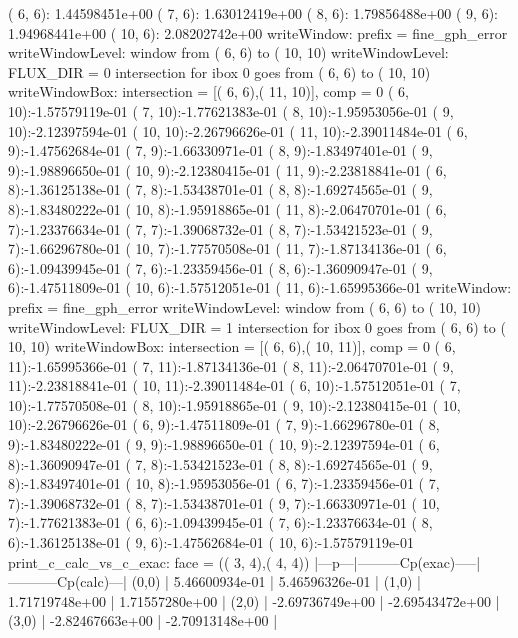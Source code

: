 \begin{itemize}
(  6,  6): 1.44598451e+00  (  7,  6): 1.63012419e+00  (  8,  6): 1.79856488e+00  (  9,  6): 1.94968441e+00  ( 10,  6): 2.08202742e+00  
writeWindow: prefix = fine_gph_error     
writeWindowLevel:  window from (  6,  6) to ( 10, 10)
writeWindowLevel: FLUX_DIR = 0
 intersection for ibox  0 goes from (  6,  6) to ( 10, 10)
writeWindowBox: intersection = [(  6,  6),( 11, 10)], comp = 0
(  6, 10):-1.57579119e-01  (  7, 10):-1.77621383e-01  (  8, 10):-1.95953056e-01  (  9, 10):-2.12397594e-01  ( 10, 10):-2.26796626e-01  ( 11, 10):-2.39011484e-01  
(  6,  9):-1.47562684e-01  (  7,  9):-1.66330971e-01  (  8,  9):-1.83497401e-01  (  9,  9):-1.98896650e-01  ( 10,  9):-2.12380415e-01  ( 11,  9):-2.23818841e-01  
(  6,  8):-1.36125138e-01  (  7,  8):-1.53438701e-01  (  8,  8):-1.69274565e-01  (  9,  8):-1.83480222e-01  ( 10,  8):-1.95918865e-01  ( 11,  8):-2.06470701e-01  
(  6,  7):-1.23376634e-01  (  7,  7):-1.39068732e-01  (  8,  7):-1.53421523e-01  (  9,  7):-1.66296780e-01  ( 10,  7):-1.77570508e-01  ( 11,  7):-1.87134136e-01  
(  6,  6):-1.09439945e-01  (  7,  6):-1.23359456e-01  (  8,  6):-1.36090947e-01  (  9,  6):-1.47511809e-01  ( 10,  6):-1.57512051e-01  ( 11,  6):-1.65995366e-01  
writeWindow: prefix = fine_gph_error     
writeWindowLevel:  window from (  6,  6) to ( 10, 10)
writeWindowLevel: FLUX_DIR = 1
 intersection for ibox  0 goes from (  6,  6) to ( 10, 10)
writeWindowBox: intersection = [(  6,  6),( 10, 11)], comp = 0
(  6, 11):-1.65995366e-01  (  7, 11):-1.87134136e-01  (  8, 11):-2.06470701e-01  (  9, 11):-2.23818841e-01  ( 10, 11):-2.39011484e-01  
(  6, 10):-1.57512051e-01  (  7, 10):-1.77570508e-01  (  8, 10):-1.95918865e-01  (  9, 10):-2.12380415e-01  ( 10, 10):-2.26796626e-01  
(  6,  9):-1.47511809e-01  (  7,  9):-1.66296780e-01  (  8,  9):-1.83480222e-01  (  9,  9):-1.98896650e-01  ( 10,  9):-2.12397594e-01  
(  6,  8):-1.36090947e-01  (  7,  8):-1.53421523e-01  (  8,  8):-1.69274565e-01  (  9,  8):-1.83497401e-01  ( 10,  8):-1.95953056e-01  
(  6,  7):-1.23359456e-01  (  7,  7):-1.39068732e-01  (  8,  7):-1.53438701e-01  (  9,  7):-1.66330971e-01  ( 10,  7):-1.77621383e-01  
(  6,  6):-1.09439945e-01  (  7,  6):-1.23376634e-01  (  8,  6):-1.36125138e-01  (  9,  6):-1.47562684e-01  ( 10,  6):-1.57579119e-01  
print_c_calc_vs_c_exac: face = ((  3,  4),(  4,  4))
|---p---|---------Cp(exac)-----|-----------Cp(calc)---|
(0,0)   |     5.46600934e-01   |     5.46596326e-01   |    
(1,0)   |     1.71719748e+00   |     1.71557280e+00   |    
(2,0)   |    -2.69736749e+00   |    -2.69543472e+00   |    
(3,0)   |    -2.82467663e+00   |    -2.70913148e+00   |    

\end{itemize}
